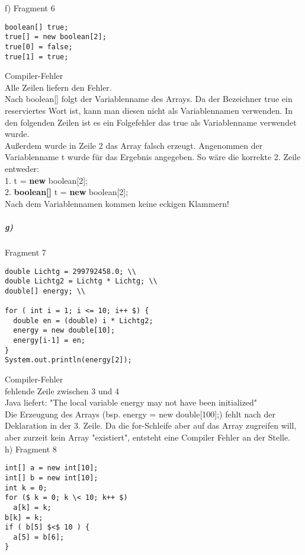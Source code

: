 \documentclass[paper=a4, fontsize=11pt]{scrartcl}
\numberwithin{equation}{section}
\numberwithin{figure}{section}
\numberwithin{table}{section}
\begin{document}
f) Fragment 6 \\

\begin{lstlisting}
boolean[] true; 
true[] = new boolean[2]; 
true[0] = false; 
true[1] = true; 
\end{lstlisting}

Compiler-Fehler\\
Alle Zeilen liefern den Fehler. \\
Nach boolean[] folgt der Variablenname des Arrays. Da der Bezeichner true ein reserviertes Wort ist, kann man diesen nicht als Variablennamen verwenden. 
In den folgenden Zeilen ist es ein Folgefehler das true als Variablenname verwendet wurde. \\
Außerdem wurde in Zeile 2 das Array falsch erzeugt. Angenommen der Variablenname t wurde für das Ergebnis angegeben. So wäre die korrekte 2. Zeile entweder: \\
1. t = \textbf{new} boolean[2]; \\
2. \textbf{boolean[]} t = \textbf{new} boolean[2];\\
Nach dem Variablennamen kommen keine eckigen Klammern! \\

\subparagraph{g)} Fragment 7

\begin{lstlisting}
double Lichtg = 299792458.0; \\
double Lichtg2 = Lichtg * Lichtg; \\
double[] energy; \\

for ( int i = 1; i <= 10; i++ $) { 
  double en = (double) i * Lichtg2; 
  energy = new double[10]; 
  energy[i-1] = en; 
} 
System.out.println(energy[2]);
\end{lstlisting}

Compiler-Fehler \\
fehlende Zeile zwischen 3 und 4\\
Java liefert: "The local variable energy may not have been initialized" \\
Die Erzeugung des Arrays (bsp. energy = new double[100];) fehlt nach der Deklaration in der 3. Zeile. Da die for-Schleife aber auf das Array zugreifen will, aber zurzeit kein Array "existiert", entsteht eine Compiler Fehler an der Stelle. \\

h) Fragment 8 \\

\begin{lstlisting}
int[] a = new int[10]; 
int[] b = new int[10]; 
int k = 0; 
for ($ k = 0; k \< 10; k++ $) 
  a[k] = k; 
b[k] = k; 
if ( b[5] $<$ 10 ) { 
  a[5] = b[6]; 
}
\end{lstlisting}
\end{document}
